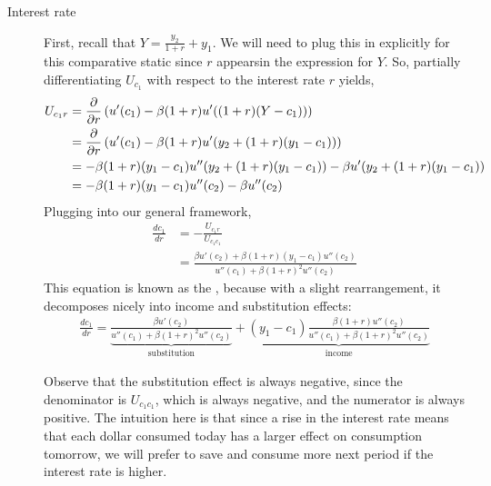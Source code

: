 \begin{description}
    \item[Interest rate] First, recall that $Y = \frac{y_2}{1 + r} + y_1$. We will need to plug this in explicitly for this comparative static since $r$ appearsin the expression for $Y$. So, partially differentiating $U_{c_1}$ with respect to the interest rate $r$ yields,
    \begin{align*}
        U_{c_1 r} &= \frac{\partial }{\partial r}\left(u'(c_1) - \beta (1 + r) u'((1 + r)(Y - c_1))\right) \\
        &= \frac{\partial }{\partial r}\left(u'(c_1) - \beta (1 + r) u'(y_2 + (1 + r)(y_1 - c_1))\right) \\ 
        &= -\beta(1 + r) (y_1 - c_1) u''(y_2 + (1 + r)(y_1 - c_1)) - \beta u'(y_2 + (1 + r)(y_1 - c_1)) \\
        &= -\beta (1 + r) (y_1 - c_1) u''(c_2) - \beta u''(c_2)
    \end{align*} 
    Plugging into our general framework,
    \begin{align*}
        \frac{dc_1}{dr} &= -\frac{U_{c_1 r}}{U_{c_1 c_1}} \\
        &= \frac{\beta u'(c_2) + \beta (1 + r)(y_1 - c_1) u''(c_2)}{u''(c_1) + \beta (1 + r)^2 u''(c_2)}
    \end{align*}
    This equation is known as the , because with a slight rearrangement, it decomposes nicely into income and substitution effects:
    \begin{align*}
        \frac{dc_1}{dr} = \underbrace{\frac{\beta u'(c_2)}{u''(c_1) + \beta (1 + r)^2 u''(c_2)}}_{\text{substitution}} + \underbrace{(y_1 - c_1) \frac{\beta(1 + r) u''(c_2)}{u''(c_1) + \beta (1 + r)^2 u''(c_2)}}_{\text{income}}
    \end{align*}
    
    Observe that the substitution effect is always negative, since the denominator is $U_{c_1 c_1}$, which is always negative, and the numerator is always positive. The intuition here is that since a rise in the interest rate means that each dollar consumed today has a larger effect on consumption tomorrow, we will prefer to save and consume more next period if the interest rate is higher. 


\end{description}

